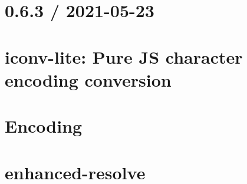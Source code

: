 \documentclass[twoside]{book}
\newcommand{\+}{\discretionary{\mbox{\scriptsize$\hookleftarrow$}}{}{}}
\begin{document}
\chapter{0.6.3 / 2021-\/05-\/23}
\label{md__c___users_vaishnavi_jadhav__desktop__developer_code_mean_stack_example_client_node_modules_efab7052b93f91ce65e4601d704b01147}

\chapter{iconv-\/lite\+: Pure JS character encoding conversion}
\label{md__c___users_vaishnavi_jadhav__desktop__developer_code_mean_stack_example_client_node_modules_e7b346844af1e89a42b36d63ff93904bd}

\chapter{Encoding}
\label{md__c___users_vaishnavi_jadhav__desktop__developer_code_mean_stack_example_client_node_modules_encoding__r_e_a_d_m_e}

\chapter{enhanced-\/resolve}
\label{md__c___users_vaishnavi_jadhav__desktop__developer_code_mean_stack_example_client_node_modules_enhanced_resolve__r_e_a_d_m_e}

\end{document}
